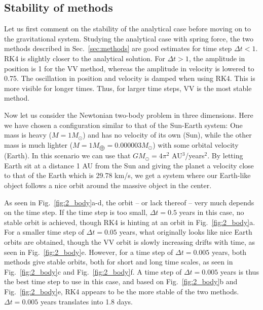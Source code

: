 \documentclass{article}
\begin{document}
\begin{multicols}{2}
\subsection{Stability of methods}

Let us first comment on the stability of the analytical case before moving on to the gravitational system. Studying the analytical case with spring force, the two methods described in Sec.~\ref{sec:methods} are good estimates for time step $\Delta t<1$. RK4 is slightly closer to the analytical solution. For $\Delta t > 1$, the amplitude in position is 1 for the VV method, whereas the amplitude in velocity is lowered to 0.75. The oscillation in position and velocity is damped when using RK4. This is more visible for longer times. Thus, for larger time steps, VV is the most stable method.

Now let us consider the Newtonian two-body problem in three dimensions. Here we have chosen a configuration similar to that of the Sun-Earth system: One mass is heavy ($M = 1 M_{\odot}$) and has no velocity of its own (Sun), while the other mass is much lighter ($M = 1 M_{\bigoplus} = 0.000003 M_{\odot}$) with some orbital velocity (Earth). In this scenario we can use that $GM_{\odot} = 4\pi^2$ AU$^3$/years$^2$. By letting Earth sit at a distance 1 AU from the Sun and giving the planet a velocity close to that of the Earth which is 29.78 km/s, we get a system where our Earth-like object follows a nice orbit around the massive object in the center. 

As seen in Fig.~\ref{fig:2_body}a-d, the orbit -- or lack thereof -- very much depends on the time step. If the time step is too small, $\Delta t = 0.5$ years in this case, no stable orbit is achieved, though RK4 is hinting at an orbit in Fig.~\ref{fig:2_body}a. For a smaller time step of $\Delta t = 0.05$ years, what originally looks like nice Earth orbits are obtained, though the VV orbit is slowly increasing drifts with time, as seen in Fig.~\ref{fig:2_body}e. However, for a time step of $\Delta t = 0.005$ years, both methods give stable orbits, both for short and long time scales, as seen in Fig.~\ref{fig:2_body}c and Fig.~\ref{fig:2_body}f. A time step of $\Delta t = 0.005$ years is thus the best time step to use in this case, and based on Fig.~\ref{fig:2_body}b and Fig.~\ref{fig:2_body}e, RK4 appears to be the more stable of the two methods. $\Delta t = 0.005$ years translates into 1.8 days.


\end{multicols}
\end{document}
